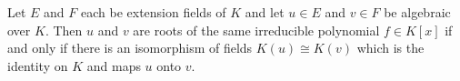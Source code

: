 Let $E$ and $F$ each be extension fields of $K$ and let $u \in E$ and $v \in F$ be algebraic over $K$. Then $u$ and $v$ are roots of the same irreducible polynomial $f \in K[x]$ if and only if there is an isomorphism of fields $K(u) \cong K(v)$ which is the identity on $K$ and maps $u$ onto $v$.
